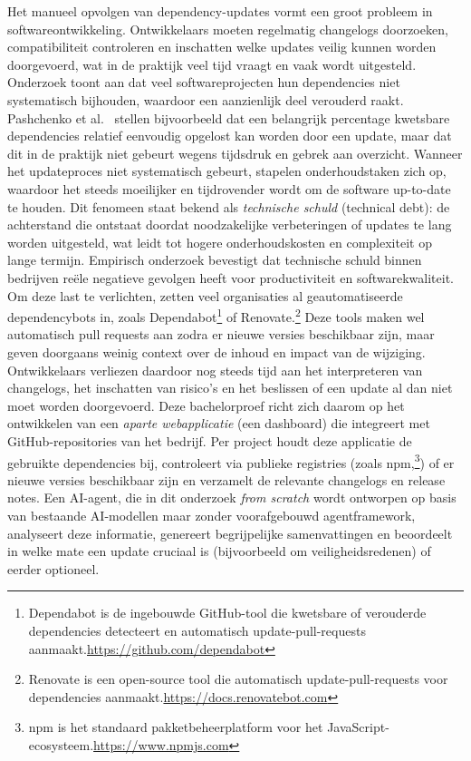 Het manueel opvolgen van dependency-updates vormt een groot probleem in softwareontwikkeling. Ontwikkelaars moeten regelmatig changelogs doorzoeken, compatibiliteit controleren en inschatten welke updates veilig kunnen worden doorgevoerd, wat in de praktijk veel tijd vraagt en vaak wordt uitgesteld.\parencite{Pashchenko2018,Behutiye2024} Onderzoek toont aan dat veel softwareprojecten hun dependencies niet systematisch bijhouden, waardoor een aanzienlijk deel verouderd raakt. Pashchenko et al.\ \parencite{Pashchenko2018} stellen bijvoorbeeld dat een belangrijk percentage kwetsbare dependencies relatief eenvoudig opgelost kan worden door een update, maar dat dit in de praktijk niet gebeurt wegens tijdsdruk en gebrek aan overzicht.
Wanneer het updateproces niet systematisch gebeurt, stapelen onderhoudstaken zich op, waardoor het steeds moeilijker en tijdrovender wordt om de software up-to-date te houden. Dit fenomeen staat bekend als \emph{technische schuld} (technical debt): de achterstand die ontstaat doordat noodzakelijke verbeteringen of updates te lang worden uitgesteld, wat leidt tot hogere onderhoudskosten en complexiteit op lange termijn.\parencite{Behutiye2024,Ruiz2024} Empirisch onderzoek bevestigt dat technische schuld binnen bedrijven reële negatieve gevolgen heeft voor productiviteit en softwarekwaliteit.\parencite{Chalmers2020}
Om deze last te verlichten, zetten veel organisaties al geautomatiseerde dependencybots in, zoals Dependabot\footnote{Dependabot is de ingebouwde GitHub-tool die kwetsbare of verouderde dependencies detecteert en automatisch update-pull-requests aanmaakt.\url{https://github.com/dependabot}} of Renovate.\footnote{Renovate is een open-source tool die automatisch update-pull-requests voor dependencies aanmaakt.\url{https://docs.renovatebot.com} } Deze tools maken wel automatisch pull requests aan zodra er nieuwe versies beschikbaar zijn,\parencite{Erlenhov2022} maar geven doorgaans weinig context over de inhoud en impact van de wijziging. Ontwikkelaars verliezen daardoor nog steeds tijd aan het interpreteren van changelogs, het inschatten van risico's en het beslissen of een update al dan niet moet worden doorgevoerd.\parencite{Erlenhov2022}
Deze bachelorproef richt zich daarom op het ontwikkelen van een \emph{aparte webapplicatie} (een dashboard) die integreert met GitHub-repositories van het bedrijf. Per project houdt deze applicatie de gebruikte dependencies bij, controleert via publieke registries (zoals npm,\footnote{npm is het standaard pakketbeheerplatform voor het JavaScript-ecosysteem.\url{https://www.npmjs.com}}) of er nieuwe versies beschikbaar zijn en verzamelt de relevante changelogs en release notes. Een AI-agent, die in dit onderzoek \emph{from scratch} wordt ontworpen op basis van bestaande AI-modellen maar zonder voorafgebouwd agentframework, analyseert deze informatie, genereert begrijpelijke samenvattingen en beoordeelt in welke mate een update cruciaal is (bijvoorbeeld om veiligheidsredenen) of eerder optioneel.
